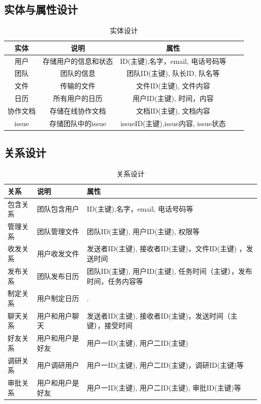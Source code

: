 \subsection{\color{red}实体与属性设计}
\begin{table}[htbp]
\centering
\caption{\color{red}实体设计} \label{tab:client-database}
\begin{tabular}{|c|c|c|c|c|}
    \hline
    实体 & 说明 & 属性 \\
    \hline
    用户 & 存储用户的信息和状态 & ID(主键),名字，email, 电话号码等 \\
    \hline
    团队 & 团队的信息 & 团队ID(主键), 队长ID, 队名等 \\
    \hline
    文件 & 传输的文件 & 文件ID(主键), 文件内容 \\
    \hline
    日历 & 所有用户的日历 & 用户ID(主键), 时间，内容 \\
    \hline 
    协作文档 & 存储在线协作文档 & 文档ID(主键), 文档内容 \\
    \hline
    issue & 存储团队中的issue & issueID(主键),issue内容, issue状态 \\
    \hline
\end{tabular}
\end{table}

\subsection{\color{red}关系设计}
\newpage
\begin{table}[htbp]
\centering
\caption{\color{red}关系设计} \label{tab:client-database}
\begin{tabular}{|p{4em}|p{8em}|p{20em}|}
    \hline
    关系 & 说明 & 属性 \\
    \hline
    包含关系 & 团队包含用户 & ID(主键),名字，email, 电话号码等 \\
    \hline
    管理关系 & 团队管理文件 & 团队ID(主键), 用户ID(主键), 权限等 \\
    \hline 
    收发关系 & 用户收发文件 & 发送者ID(主键), 接收者ID(主键)，文件ID(主键) ，发送时间\\
    \hline
    发布关系 & 团队发布日历 & 团队ID(主键), 用户ID(主键), 任务时间（主键），发布时间，任务内容等 \\
    \hline
    制定关系 & 用户制定日历 & . \\
    \hline 
    聊天关系 & 用户和用户聊天 & 发送者ID(主键), 接收者ID(主键)，发送时间（主键），接受时间 \\
    \hline 
    好友关系 & 用户和用户是好友 & 用户一ID(主键), 用户二ID(主键) \\
    \hline
    调研关系 & 用户调研用户 & 用户一ID(主键), 用户二ID(主键)，调研ID(主键)等\\
    \hline
    审批关系 & 用户和用户是好友 & 用户一ID(主键), 用户二ID(主键), 审批ID(主键)等\\
    \hline
\end{tabular}
\end{table}
